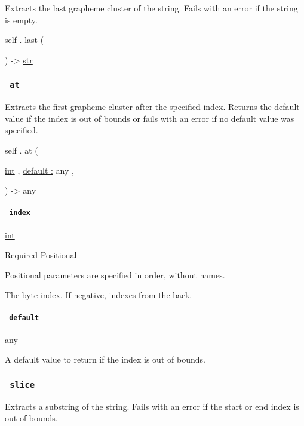 Extracts the last grapheme cluster of the string. Fails with an error if
the string is empty.

self { . } { last } (

) -\textgreater{} \href{/docs/reference/foundations/str/}{str}

\subsubsection{\texorpdfstring{\texttt{\ at\ }}{ at }}\label{definitions-at}

Extracts the first grapheme cluster after the specified index. Returns
the default value if the index is out of bounds or fails with an error
if no default value was specified.

self { . } { at } (

{ \href{/docs/reference/foundations/int/}{int} , } {
\hyperref[definitions-at-parameters-default]{default :} { any } , }

) -\textgreater{} { any }

\paragraph{\texorpdfstring{\texttt{\ index\ }}{ index }}\label{definitions-at-index}

\href{/docs/reference/foundations/int/}{int}

{Required} {{ Positional }}

\label{definitions-at-index-positional-tooltip}
Positional parameters are specified in order, without names.

The byte index. If negative, indexes from the back.

\paragraph{\texorpdfstring{\texttt{\ default\ }}{ default }}\label{definitions-at-default}

{ any }

A default value to return if the index is out of bounds.

\subsubsection{\texorpdfstring{\texttt{\ slice\ }}{ slice }}\label{definitions-slice}

Extracts a substring of the string. Fails with an error if the start or
end index is out of bounds.

